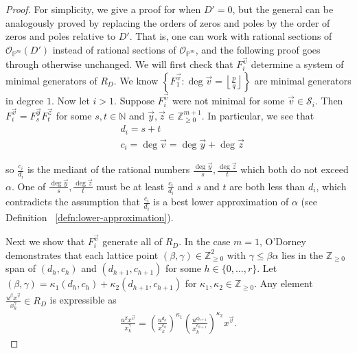 \documentclass{amsart}
\theoremstyle{plain}
\theoremstyle{definition}
\theoremstyle{remark}
\numberwithin{equation}{section}
\newcommand\bn{{\mathbb N}}
\newcommand\bp{{\mathbb P}}
\newcommand\bz{{\mathbb Z}}
\newcommand\mss{\mathscr{S}}
\begin{document}
\begin{proof}
For simplicity, we give a proof for when $D' = 0$, but the general
can be analogously proved by replacing the orders of zeros and poles
by the order of zeros and poles relative to $D'$. That is,
one can work with rational sections of $\mathscr O_{\bp^m}(D')$
instead of rational sections of $\mathscr O_{\bp^m}$,
and the following proof goes through otherwise unchanged.
We will first check that $F^{\vec v}_i$ determine a system of minimal
generators of $R_D$. We know $\left\{F_{1}^{\vec{v}} : \deg \vec{v} =
\left\lfloor
\frac{p}{q} \right\rfloor \right\}$ are minimal generators in
degree $1$. Now let $i > 1$. Suppose $F_i^{\vec{v}}$ were not
minimal for some $\vec{v} \in \mss_i$. Then $F_i^{\vec{v}} =
F_{s}^{\vec{y}} F_{t}^{\vec{z}}$ for some $s, t \in \bn$ and
$\vec{y}, \vec{z} \in \bz_{ \geq 0}^{m + 1}$. In particular, we see
that 
\begin{align*}
	&d_i = s + t \\
	&c_i = \deg \vec{v} = \deg \vec{y} + \deg \vec{z}
\end{align*}

\noindent
so $\frac{c_i}{d_i}$ is the mediant of the rational numbers
$\frac{\deg \vec{y}}{s}, \frac{\deg \vec{z}}{t}$ which both
do not exceed $\alpha$. One of $\frac{\deg \vec{y}}{s},
\frac{\deg \vec{z}}{t}$ must be at least $\frac{c_i}{d_i}$
and $s$ and $t$ are both less than $d_i$, which contradicts the assumption that
$\frac{c_i}{d_i}$ is a best lower approximation of $\alpha$
(see Definition ~\ref{defn:lower-approximation}).

Next we show that $F^{\vec v}_i$ generate all of $R_D$. In the case $m = 1$, O'Dorney \cite[Theorem 6]
{dorney:canonical} demonstrates that each lattice point $(\beta, \gamma) \in
\bz_{\geq 0}^2$ with $\gamma \leq \beta \alpha$ lies in the $\bz_{\geq 0}$ span
of $(d_h, c_h)$ and $(d_{h + 1}, c_{h + 1})$ for
some $h \in \{0, \ldots, r\}$. Let $(\beta, \gamma) = \kappa_1
(d_h, c_h) + \kappa_2 (d_{h + 1}, c_{h + 1})$ for $\kappa_1, \kappa_2 \in
\bz_{\geq 0}$. Any element $\frac{u^{\beta}
x^{\vec{v}}} {x_k^{ \gamma}} \in R_D$ is expressible as
\begin{align*}
	\frac{u^{\beta} x^{\vec{v}}} {x_k^{\gamma}} = \left(\frac{u^{d_h}}
	{x_k^{c_h}}\right)^{\kappa_1} \left(\frac{u^{d_{h + 1}}}
	{x_k^{c_{h + 1}}}\right)^{\kappa_2} x^{\vec{v}}.
\end{align*}


\end{proof}
\end{document}
